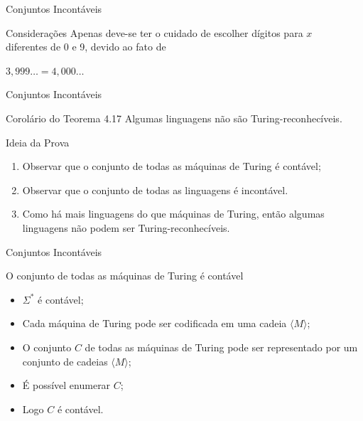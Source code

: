 \documentclass[xcolor=dvipsnames,table]{beamer}
\begin{document}
	\begin{frame}{Conjuntos Incontáveis}
		\begin{block}{Considerações}
			Apenas deve-se ter o cuidado de escolher dígitos para $x$ \\diferentes de 0 e 9, devido ao fato de 
			\begin{center}
				$3,999 \ldots = 4,000 \ldots$
			\end{center}
		\end{block}
	\end{frame}
	
	\begin{frame}{Conjuntos Incontáveis}
		\begin{exampleblock}{Corolário do Teorema 4.17}
			Algumas linguagens não são Turing-reconhecíveis.
		\end{exampleblock} \pause
		\begin{block}{Ideia da Prova}
			\begin{enumerate}
				\item Observar que o conjunto de todas as máquinas de Turing é contável;
				\item Observar que o conjunto de todas as linguagens é incontável.
				\item Como há mais linguagens do que máquinas de Turing, então algumas linguagens não podem ser Turing-reconhecíveis.
			\end{enumerate}
		\end{block}
	\end{frame}
	
	\begin{frame}{Conjuntos Incontáveis}
		\begin{block}{O conjunto de todas as máquinas de Turing é contável}
			\begin{itemize}
				\item $\Sigma^*$ é contável;
				\item Cada máquina de Turing pode ser codificada em uma cadeia $\langle M \rangle$;
				\item O conjunto $C$ de todas as máquinas de Turing pode ser representado por um conjunto de cadeias $\langle M \rangle$;
				\item É possível enumerar $C$;
				\item Logo $C$ é contável.
			\end{itemize}
		\end{block}
	\end{frame}
	
\end{document}
